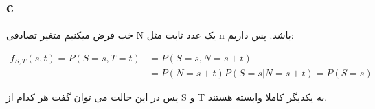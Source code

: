 \documentclass{article}[12pt]
\begin{document}
\subsection{c}
خب فرض میکنیم متغیر تصادفی N
یک عدد ثابت مثل n باشد.
پس داریم:

\begin{equation}
\begin{split}
f_{S,T}(s,t) = P(S=s,T=t) 
&= 
P(S=s,N=s+t) \\&= P(N=s+t)P(S=s|N=s+t) = P(S=s)
\end{split}
\end{equation}

پس در این حالت می توان گفت هر کدام از S
و 
T
به یکدیگر کاملا وابسته هستند. 
\end{document}
